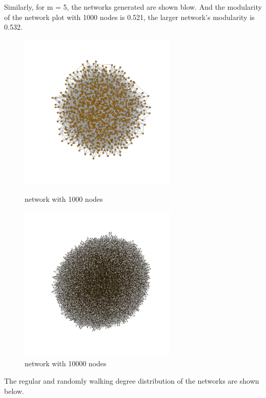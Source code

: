 \documentclass[draftcls,12pt,onecolumn]{IEEEtran}
\begin{document}
 Similarly, for m = 5, the networks generated are shown blow. And the modularity of the network plot with 1000 nodes is 0.521, the larger network's modularity is 0.532.
\begin{figure}[htbp]
\centering
\begin{minipage}[t]{0.48\textwidth}
\centering
\includegraphics[width=7.5cm]{img/2_g_2_network}
\caption{network with 1000 nodes}
\end{minipage}
\begin{minipage}[t]{0.48\textwidth}
\centering
\includegraphics[width=7.5cm]{img/2_g_2_network2}
\caption{network with 10000 nodes}
\end{minipage}
\end{figure}
The regular and randomly walking degree distribution of the networks are shown below.
\end{document}
